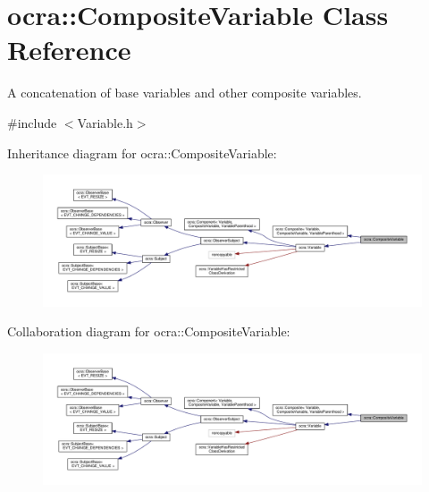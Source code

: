 \hypertarget{classocra_1_1CompositeVariable}{}\section{ocra\+:\+:Composite\+Variable Class Reference}
\label{classocra_1_1CompositeVariable}


A concatenation of base variables and other composite variables.  




{\ttfamily \#include $<$Variable.\+h$>$}



Inheritance diagram for ocra\+:\+:Composite\+Variable\+:
\nopagebreak
\begin{figure}[H]
\begin{center}
\leavevmode
\includegraphics[width=350pt]{d7/d95/classocra_1_1CompositeVariable__inherit__graph}
\end{center}
\end{figure}


Collaboration diagram for ocra\+:\+:Composite\+Variable\+:
\nopagebreak
\begin{figure}[H]
\begin{center}
\leavevmode
\includegraphics[width=350pt]{db/da1/classocra_1_1CompositeVariable__coll__graph}
\end{center}
\end{figure}
